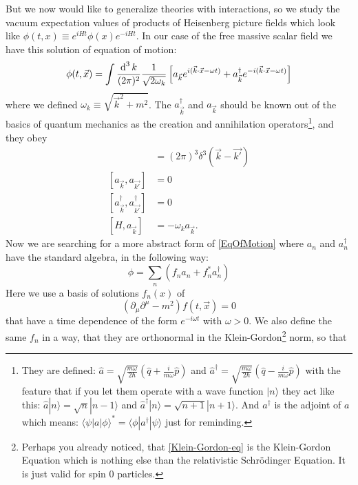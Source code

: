 	But we now would like to generalize theories with interactions, so we study the vacuum expectation values of products of Heisenberg picture fields which look like $\phi(t,x) \equiv e^{iHt} \phi(x) e^{-iHt}$. In our case of the free massive scalar field we have this solution of equation of motion:
		\begin{equation}  \label{EqOfMotion}
			\phi(t,\vec{x}) = \int \frac{\operatorname{d}^3 k}{(2\pi)^2} \frac{1}{\sqrt{2\omega_k}} 
			\left[ a_{\vec{k}} e^{i(\vec{k}\cdot\vec{x}-\omega t)} +
			a^{\dagger}_{\vec{k}} e^{-i(\vec{k}\cdot\vec{x}-\omega t)}
			\right]
		\end{equation}
	where we defined $\omega_k \equiv \sqrt{\vec{k}^2+m^2}$. The $a^{\dagger}_{\vec{k}}$ and $a_{\vec{k}}$ should be known out of the basics of quantum mechanics as the creation and annihilation operators\footnote{They are defined: $\hat{a}= \sqrt{\frac{m\omega}{2\hbar}} 
		\left(\hat{q} + \frac{i}{m\omega}\hat{p}
		\right)
		$ and 
		$ \hat{a}^{\dagger}= \sqrt{\frac{m\omega}{2\hbar}} 
		\left(\hat{q} - \frac{i}{m\omega}\hat{p}
		\right)
		$
	with the feature that if you let them operate with a wave function $|n\rangle$ they act like this:
	$\hat{a}|n\rangle = \sqrt{n}|n-1\rangle$ and $\hat{a}^{\dagger}|n\rangle= \sqrt{n+1}|n+1\rangle$.
	And $a^{\dagger}$ is the adjoint of $a$ which means: $\langle \psi | a | \phi \rangle^*= \langle \phi | a^{\dagger} | \psi \rangle$ just for reminding.
	}, and they obey
		\begin{align*}
			[a_{\vec{k}},a^{\dagger}_{\vec{k'}}]&= (2\pi)^3 \delta^3 (\vec{k}-\vec{k'})\\
			[a_{\vec{k}},a_{\vec{k'}}]&=0 \\
			[a^{\dagger}_{\vec{k}},a^{\dagger}_{\vec{k'}}]&=0 \\
			[H,a_{\vec{k}}]&=-\omega_k a_{\vec{k}}.
		\end{align*}
	Now we are searching for a more abstract form of \eqref{EqOfMotion} where $a_n$ and $a^{\dagger}_n$ have the standard algebra, in the following way:
		\begin{equation} \label{wave_fct}
			\phi = \sum_n \left(f_n a_n + f^*_n a^{\dagger}_n \right)
		\end{equation}
	Here we use a basis of solutions $f_n(x)$ of
		\begin{equation} \label{Klein-Gordon-eq}
			\left( \partial_{\mu}\partial^{\mu} - m^2 \right) f(t,\vec{x})=0
		\end{equation}			
	that have a time dependence of the form $e^{-i\omega t}$ with $\omega>0$. We also define the same $f_n$ in a way, that they are orthonormal in the Klein-Gordon\footnote{Perhaps you already noticed, that \eqref{Klein-Gordon-eq} is the Klein-Gordon Equation which is nothing else than the relativistic Schrödinger Equation. It is just valid for spin 0 particles.} norm, so that
